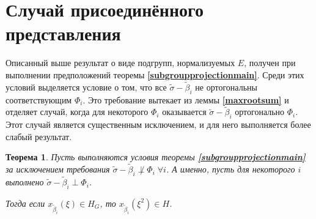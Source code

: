 \documentclass[12pt]{matmex-diploma}
\theoremstyle{mystyleni}
\theoremstyle{mystyle}
\newtheorem{thm}{Теорема}
\newcommand\refb[1]{\textbf{\ref{#1}}}
\begin{document}
\pagebreak
\section{Случай присоединённого представления}

Описанный выше результат о виде подгрупп, нормализуемых $E$, получен при выполнении предположений теоремы \refb{subgroupprojectionmain}. Среди этих условий выделяется условие о том, что все $\widetilde\sigma-\widetilde\beta_i$ не ортогональны соответствующим $\Phi_i$. Это требование вытекает из леммы \refb{maxrootsum} и отделяет случай, когда для некоторого $\Phi_i$ оказывается $\widetilde\sigma-\widetilde\beta_i$ ортогонально $\Phi_i$. Этот случай является существенным исключением, и для него выполняется более слабый результат.

\begin{thm}
Пусть выполняются условия теоремы \refb{subgroupprojectionmain} за исключением требования $\widetilde\sigma-\widetilde\beta_i \not\perp \Phi_i \; \forall i$. А именно, пусть для некоторого $i$ выполнено $\widetilde\sigma-\widetilde\beta_i \perp \Phi_i$.

Тогда если $x_{\widetilde\beta_i}(\xi) \in H_G$, то $x_{\widetilde\beta_i}(\xi^2) \in H$.
\end{thm}
\end{document}
